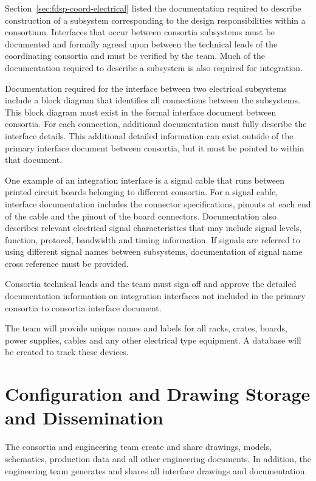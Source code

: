 Section~\ref{sec:fdsp-coord-electrical} listed the documentation
required to describe construction of a subsystem corresponding to the
design responsibilities within a consortium.  Interfaces that occur
between consortia subsystems must be documented and formally agreed
upon between the technical leads of the coordinating consortia and
must be verified by the  team.  Much of the
documentation required to describe a subsystem is also required for
integration.


Documentation required for the interface between two electrical
subsystems include a block diagram that identifies all connections
between the subsystems.  This block diagram must exist in the formal
interface document between consortia.  For each connection, additional
documentation must fully describe the interface
details. This additional detailed information can exist outside of the
primary interface document between consortia, but it must be pointed
to within that document.


One example of an integration interface is a signal cable that runs
between printed circuit boards belonging to different consortia.  For
a signal cable, interface documentation includes the connector
specifications, pinouts at each end of the cable and the pinout of the
board connectors.  Documentation also describes
relevant electrical signal characteristics that may include signal
levels, function, protocol, bandwidth and timing information.  If
signals are referred to using different signal names between
subsystems, documentation of signal name cross reference must be
provided.


Consortia technical leads and the  team must sign off
and approve the detailed documentation information on integration
interfaces not included in the primary consortia to consortia
interface document.

The  team will provide unique names and labels
for all racks, crates, boards, power supplies, cables and any other
electrical type equipment.  A database will be created to track these
devices.

\section{Configuration and Drawing Storage and Dissemination}
\label{sec:fdsp-coord-integ-modelplan}

The consortia and  engineering team create and share
drawings, models, schematics, production data and all other
engineering documents. In addition, the  engineering team
generates and shares all interface drawings and documentation.


